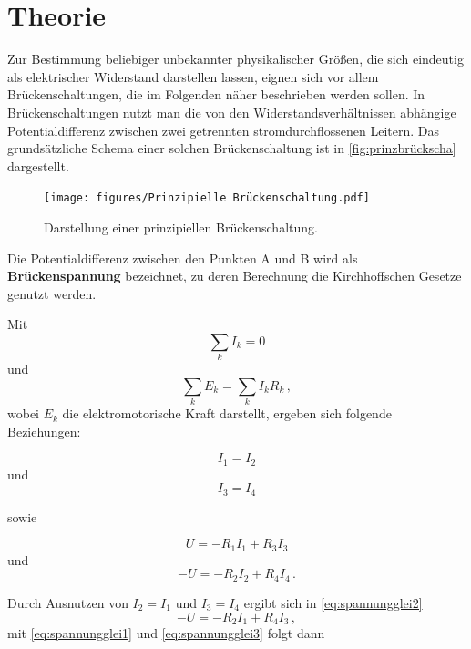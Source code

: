 \section{Theorie}
\label{sec:Theorie}

Zur Bestimmung beliebiger unbekannter physikalischer Größen, die sich eindeutig als elektrischer Widerstand darstellen lassen, eignen sich vor allem Brückenschaltungen, die im Folgenden näher beschrieben werden sollen. 
In Brückenschaltungen nutzt man die von den Widerstandsverhältnissen abhängige Potentialdifferenz zwischen zwei getrennten stromdurchflossenen Leitern. Das grundsätzliche Schema einer solchen Brückenschaltung ist in \autoref{fig:prinzbrückscha} dargestellt.

\begin{figure}[H]
    \centering
    \texttt{[image: figures/Prinzipielle Brückenschaltung.pdf]}
    \caption{Darstellung einer prinzipiellen Brückenschaltung\cite{ap07}.}
    \label{fig:prinzbrückscha}
\end{figure}

Die Potentialdifferenz zwischen den Punkten A und B wird als \textbf{Brückenspannung} bezeichnet, zu deren Berechnung die Kirchhoffschen Gesetze genutzt werden.

Mit 
\begin{equation}
    \sum_kI_k = 0
    \label{eq:kirchhoff1}
\end{equation}
und 
\begin{equation}
    \sum_k E_k = \sum_k I_k R_k \,,
    \label{eq:kirchhoff2}
\end{equation} wobei $E_k$ die elektromotorische Kraft darstellt,
ergeben sich folgende Beziehungen:

\begin{equation*}
    I_1 = I_2
\end{equation*}
und
\begin{equation*}
    I_3 = I_4
\end{equation*}

sowie

\begin{equation}
    U = -R_1 I_1 + R_3 I_3
    \label{eq:spannungglei1}
\end{equation}
und
\begin{equation}
    -U = -R_2 I_2 + R_4 I_4 \,.
    \label{eq:spannungglei2}
\end{equation}

Durch Ausnutzen von $I_2 = I_1$ und $I_3 = I_4$ ergibt sich in \eqref{eq:spannungglei2}
\begin{equation}
    -U = -R_2 I_1 + R_4 I_3
    \label{eq:spannungglei3} \,, 
\end{equation}
mit \eqref{eq:spannungglei1} und \eqref{eq:spannungglei3} folgt dann


